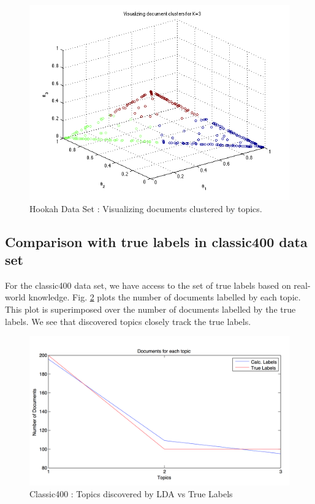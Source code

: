 \documentclass[11pt,a4paper,oneside]{article}
\begin{document}
\begin{figure}[H]
\centering
\includegraphics[width=\columnwidth]{scatter_hookah}
\caption{Hookah Data Set : Visualizing documents clustered by topics.}
\label{fig:scatter_hookah}
\end{figure}

\subsection{Comparison with true labels in classic400 data set}
For the classic400 data set, we have access to the set of true labels based on real-world knowledge. Fig. \ref{fig:truelabels} plots the number of documents labelled by each topic. This plot is superimposed over the number of documents labelled by the true labels. We see that discovered topics closely track the true labels.

\begin{figure}[H]
\centering
\includegraphics[width=\columnwidth]{truelabels}
\caption{Classic400 : Topics discovered by LDA vs True Labels}
\label{fig:truelabels}
\end{figure}
\end{document}
